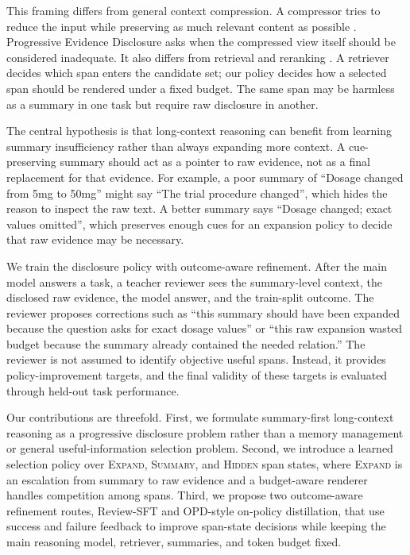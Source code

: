 \documentclass[11pt]{article}
\newcommand{\method}{Progressive Evidence Disclosure}
\newcommand{\expandact}{\textsc{Expand}}
\newcommand{\summaryact}{\textsc{Summary}}
\newcommand{\hiddenact}{\textsc{Hidden}}
\begin{document}
This framing differs from general context compression. A compressor tries to reduce the input while preserving as much relevant content as possible \citep{jiang2023llmlingua,jiang2024longllmlingua}. \method{} asks when the compressed view itself should be considered inadequate. It also differs from retrieval and reranking \citep{lewis2020rag}. A retriever decides which span enters the candidate set; our policy decides how a selected span should be rendered under a fixed budget. The same span may be harmless as a summary in one task but require raw disclosure in another.

The central hypothesis is that long-context reasoning can benefit from learning summary insufficiency rather than always expanding more context. A cue-preserving summary should act as a pointer to raw evidence, not as a final replacement for that evidence. For example, a poor summary of ``Dosage changed from 5mg to 50mg'' might say ``The trial procedure changed'', which hides the reason to inspect the raw text. A better summary says ``Dosage changed; exact values omitted'', which preserves enough cues for an expansion policy to decide that raw evidence may be necessary.

We train the disclosure policy with outcome-aware refinement. After the main model answers a task, a teacher reviewer sees the summary-level context, the disclosed raw evidence, the model answer, and the train-split outcome. The reviewer proposes corrections such as ``this summary should have been expanded because the question asks for exact dosage values'' or ``this raw expansion wasted budget because the summary already contained the needed relation.'' The reviewer is not assumed to identify objective useful spans. Instead, it provides policy-improvement targets, and the final validity of these targets is evaluated through held-out task performance.

Our contributions are threefold. First, we formulate summary-first long-context reasoning as a progressive disclosure problem rather than a memory management or general useful-information selection problem. Second, we introduce a learned selection policy over \expandact{}, \summaryact{}, and \hiddenact{} span states, where \expandact{} is an escalation from summary to raw evidence and a budget-aware renderer handles competition among spans. Third, we propose two outcome-aware refinement routes, Review-SFT and OPD-style on-policy distillation, that use success and failure feedback to improve span-state decisions while keeping the main reasoning model, retriever, summaries, and token budget fixed.
\end{document}

